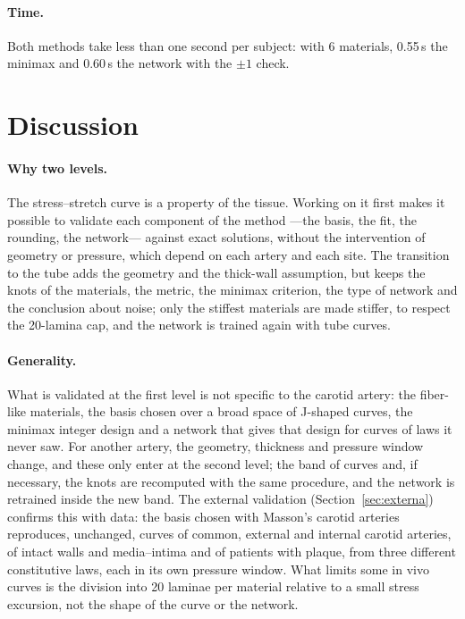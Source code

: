 \paragraph{Time.} Both methods take less than one second per subject: with 6 materials, 0.55\,s the minimax and 0.60\,s the network with the $\pm1$ check.

\section{Discussion}
\paragraph{Why two levels.} The stress--stretch curve is a property of the tissue. Working on it first makes it possible to validate each component of the method ---the basis, the fit, the rounding, the network--- against exact solutions, without the intervention of geometry or pressure, which depend on each artery and each site. The transition to the tube adds the geometry and the thick-wall assumption, but keeps the knots of the materials, the metric, the minimax criterion, the type of network and the conclusion about noise; only the stiffest materials are made stiffer, to respect the 20-lamina cap, and the network is trained again with tube curves.

\paragraph{Generality.} What is validated at the first level is not specific to the carotid artery: the fiber-like materials, the basis chosen over a broad space of J-shaped curves, the minimax integer design and a network that gives that design for curves of laws it never saw. For another artery, the geometry, thickness and pressure window change, and these only enter at the second level; the band of curves and, if necessary, the knots are recomputed with the same procedure, and the network is retrained inside the new band. The external validation (Section~\ref{sec:externa}) confirms this with data: the basis chosen with Masson's carotid arteries reproduces, unchanged, curves of common, external and internal carotid arteries, of intact walls and media--intima and of patients with plaque, from three different constitutive laws, each in its own pressure window. What limits some in vivo curves is the division into 20 laminae per material relative to a small stress excursion, not the shape of the curve or the network.

